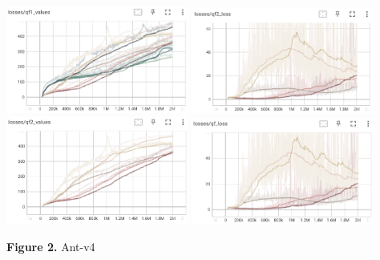 \documentclass[english, a4paper,12pt]{article}
\begin{document}
\includegraphics[width=6cm]{qf1_values_ant.png}
\includegraphics[width=6cm]{qf2_loss_ant.png}
\includegraphics[width=6cm]{qf2_values_ant.png}
\includegraphics[width=6cm]{qf_loss_ant.png}
\begin{center}
    \textbf{Figure 2.} Ant-v4
\end{center}
\end{document}
